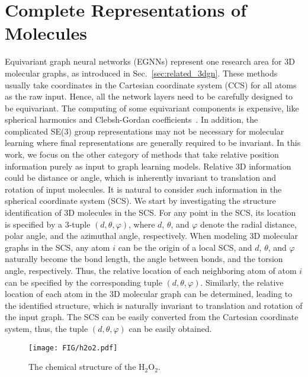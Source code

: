 \documentclass{article}
\begin{document}
\section{Complete Representations of Molecules} \label{sec:comp}
Equivariant graph neural networks (EGNNs) represent one research area for 3D molecular graphs,
as introduced in Sec.~\ref{sec:related_3dgn}.
\textcolor{COLOR}{These methods usually take coordinates in the Cartesian coordinate system (CCS) for
all atoms as the raw input.
Hence, all the network layers need to be carefully designed to be equivariant.
The computing of some equivariant components is expensive,
like spherical harmonics and Clebsh-Gordan coefficients~\citep{thomas2018tensor,fuchs2020se}.
In addition, the complicated SE(3) group representations may not be necessary for molecular learning where final representations are
generally required to be invariant.}
In this work, we focus on the other category of methods that take relative position information purely as input to graph learning models.
Relative 3D information could be distance or angle, which is inherently invariant to translation and rotation
of input molecules.
It is natural to consider such information in the spherical coordinate system (SCS).
We start by investigating the structure identification of 3D molecules
in the SCS.
For any point in the SCS, its location is specified 
by a 3-tuple $(d, \theta, \varphi)$,
where $d$, $\theta$, and $\varphi$
denote the radial distance, polar angle,
and the azimuthal angle, respectively.
When modeling 3D molecular graphs in the SCS,
any atom $i$ can be the origin of a local SCS,
and $d$, $\theta$, and $\varphi$ naturally become
the bond length,
the angle between bonds,
and the torsion angle, respectively.
Thus, the relative location of each neighboring atom 
of atom $i$ can be specified
by the corresponding tuple $(d, \theta, \varphi)$.
Similarly, the relative location of each atom
in the 3D molecular graph can be determined,
leading to the identified structure,
which is naturally invariant to translation and rotation of the input graph.
The SCS can be easily converted from the Cartesian coordinate system,
thus, the tuple $(d, \theta, \varphi)$ can be easily obtained.

\begin{wrapfigure}[9]{r}{0.45\textwidth}\vspace{-0.4 cm}
    \texttt{[image: FIG/h2o2.pdf]}
    \vspace{-25 pt}
    \caption{The chemical structure of the $\mbox{H}_2\mbox{O}_2$.
    }\label{fig:h2o2}
    \vspace{-10 pt}
\end{wrapfigure}
\end{document}
